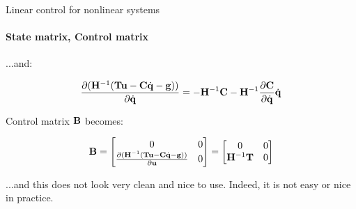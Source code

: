 \documentclass{beamer}
\begin{document}
\begin{frame}{Linear control for nonlinear systems}
\framesubtitle{State matrix, Control matrix}
\begin{flushleft}

...and:

\begin{equation}
\frac{\partial (\mathbf{H}^{-1} (\mathbf{T}\mathbf{u} -  \mathbf{C} \dot{\mathbf{q}} - \mathbf{g}) )}{\partial \dot{\mathbf{q}}} 
= 
-\mathbf{H}^{-1}\mathbf{C} - \mathbf{H}^{-1} 
\frac{\partial \mathbf{C}}{\partial \dot{\mathbf{q}}}  \dot{\mathbf{q}}
\end{equation}

Control matrix $\mathbf{B}$ becomes:

\begin{equation}
    \mathbf{B} = 
    \begin{bmatrix}
    0 & 0 \\
    \frac{\partial (\mathbf{H}^{-1} (\mathbf{T}\mathbf{u} -  \mathbf{C} \dot{\mathbf{q}} - \mathbf{g}) )}{\partial \mathbf{u}} 
    &
    0
    \end{bmatrix}
    =
        \begin{bmatrix}
    0 & 0 \\
    \mathbf{H}^{-1} \mathbf{T}
    &
    0
    \end{bmatrix}
\end{equation}

...and this does not look very clean and nice to use. Indeed, it is not easy or nice in practice.

\end{flushleft}
\end{frame}



\end{document}
